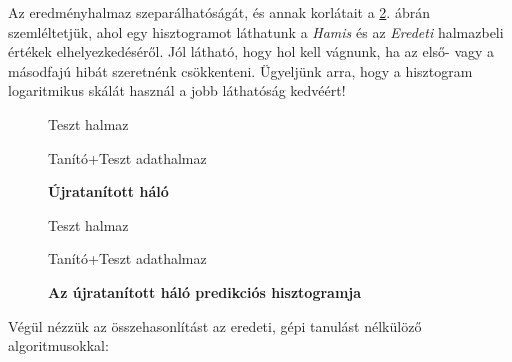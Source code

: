 Az eredményhalmaz szeparálhatóságát, és annak korlátait a \ref{fig:histogram-ujratanitott}.
ábrán szemléltetjük, ahol egy hisztogramot láthatunk a \textit{Hamis} és az \textit{Eredeti}
halmazbeli értékek elhelyezkedéséről. Jól látható, hogy hol kell vágnunk, ha az 
első- vagy a másodfajú hibát szeretnénk csökkenteni. Ügyeljünk arra, hogy a hisztogram
logaritmikus skálát használ a jobb láthatóság kedvéért!


\begin{figure}[ht]
	
	
	\begin{minipage}[c]{0.5\linewidth}
		
		\caption{Teszt halmaz}\label{fig:roc-test}
		
	\end{minipage}\hfill
	\begin{minipage}[c]{0.5\linewidth}
		
		\caption{Tanító+Teszt adathalmaz}\label{fig:roc-full}
		
	\end{minipage}
	\caption{\textbf{Újratanított háló}}
	\label{fig:ujratanitott.feladat}
\end{figure}



\begin{figure}[ht]
	
	
	\begin{minipage}[c]{0.5\linewidth}
		
		\caption{Teszt halmaz}\label{fig:hist-test}
		
	\end{minipage}\hfill
	\begin{minipage}[c]{0.5\linewidth}
		
		\caption{Tanító+Teszt adathalmaz}\label{fig:hist-full}
		
	\end{minipage}
	\caption{\textbf{Az újratanított háló predikciós hisztogramja}}
	\label{fig:histogram-ujratanitott}
\end{figure}


Végül nézzük az összehasonlítást az eredeti, gépi tanulást nélkülöző algoritmusokkal:


